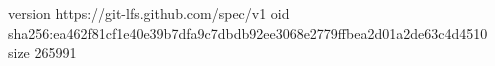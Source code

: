 version https://git-lfs.github.com/spec/v1
oid sha256:ea462f81cf1e40e39b7dfa9c7dbdb92ee3068e2779ffbea2d01a2de63c4d4510
size 265991

